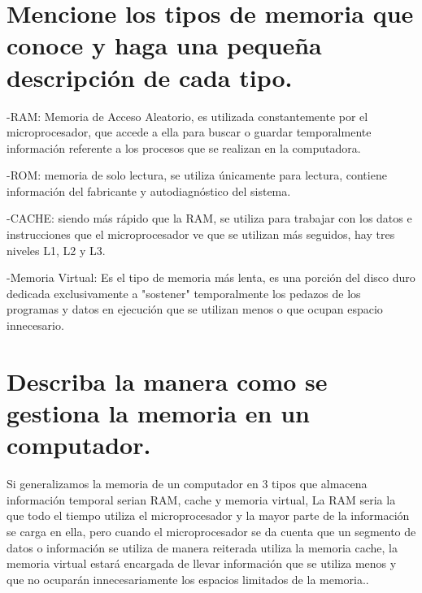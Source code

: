 \documentclass{article}
\begin{document}
\section{Mencione los tipos de memoria que conoce y haga una pequeña descripción de cada tipo.}

-RAM: Memoria de Acceso Aleatorio, es utilizada constantemente por el microprocesador, que accede a ella para buscar o guardar temporalmente información referente a los procesos que se realizan en la computadora. \cite{Venturini}

-ROM: memoria de solo lectura, se utiliza únicamente para lectura, contiene información del fabricante y autodiagnóstico del sistema. \cite{wiki}


-CACHE: siendo más rápido que la RAM, se utiliza para trabajar con los datos e instrucciones que el microprocesador ve que se utilizan más seguidos, hay tres niveles L1, L2 y L3.

-Memoria Virtual: Es el tipo de memoria más lenta, es una porción del disco duro dedicada exclusivamente a "sostener"  temporalmente los pedazos de los programas y datos en ejecución que se utilizan menos o que ocupan espacio innecesario.\cite{Augusto}

\section{Describa la manera como se gestiona la memoria en un computador.}

Si generalizamos la memoria de un computador en 3 tipos que almacena información temporal serian RAM, cache y memoria virtual, La RAM seria la que todo el tiempo utiliza el microprocesador y la mayor parte de la información se carga en ella, pero cuando el microprocesador se da cuenta que un segmento de datos o información se utiliza de manera reiterada utiliza la memoria cache, la memoria virtual estará encargada de llevar información que se utiliza menos y que no ocuparán innecesariamente los espacios limitados de la memoria..\cite{Augusto}
\end{document}
